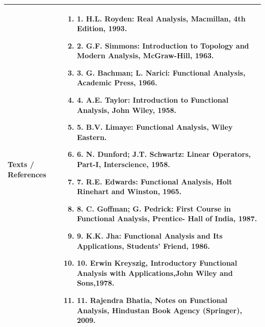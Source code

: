 \documentclass[11pt,a4paper]{article}
\begin{document}
\begin{tabularx}{\textwidth}{|p{3.2cm}|X|}
\hline
\textbf{Texts / References} & \begin{enumerate}[leftmargin=*,noitemsep,topsep=2pt]  \item 1. H.L. Royden: Real Analysis, Macmillan, 4th Edition, 1993.  \item 2. G.F. Simmons: Introduction to Topology and Modern Analysis, McGraw-Hill, 1963.  \item 3. G. Bachman; L. Narici: Functional Analysis, Academic Press, 1966.  \item 4. A.E. Taylor: Introduction to Functional Analysis, John Wiley, 1958.  \item 5. B.V. Limaye: Functional Analysis, Wiley Eastern.  \item 6. N. Dunford; J.T. Schwartz: Linear Operators, Part-I, Interscience, 1958.  \item 7. R.E. Edwards: Functional Analysis, Holt Rinehart and Winston, 1965.  \item 8. C. Goffman; G. Pedrick: First Course in Functional Analysis, Prentice- Hall of India, 1987.  \item 9. K.K. Jha: Functional Analysis and Its Applications, Students' Friend, 1986.  \item 10. Erwin Kreyszig, Introductory Functional Analysis with Applications,John Wiley and  Sons,1978.  \item 11. Rajendra Bhatia, Notes on Functional Analysis, Hindustan Book Agency (Springer), 2009.\end{enumerate} \\
\hline
\end{tabularx}
\clearpage
\end{document}

